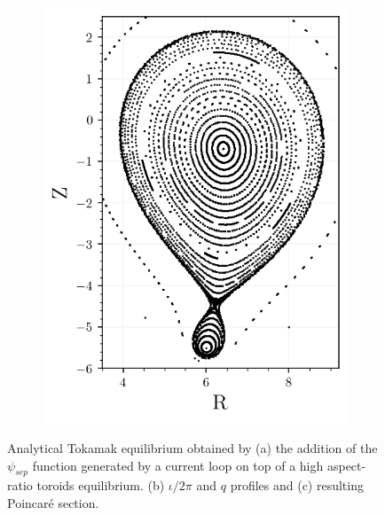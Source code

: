 \begin{figure}[H]
\begin{minipage}{0.45\textwidth}
\begin{subfigure}[b]{0.99\textwidth}
            \caption{}
            \label{fig:toytok-base-iotaq}
        \end{subfigure}
    \end{minipage}%
    \begin{minipage}{0.5\textwidth} %
        \centering
        \begin{subfigure}[b]{\textwidth}
            \centering
            \includegraphics[width=\textwidth]{images/toytok/unperturbed/poincare.png}
            \caption{}
            \label{fig:toytok-base-p}
        \end{subfigure}
    \end{minipage}
    \caption{Analytical Tokamak equilibrium obtained by (a) the addition of the $\psi_{sep}$ function generated by a current loop on top of a high aspect-ratio toroids equilibrium. (b) $\iota/2\pi$ and $q$ profiles and (c) resulting Poincaré section.}
    \label{fig:toytok-base}
\end{figure}

